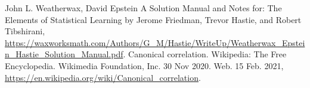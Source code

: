 \begin{thebibliography}{9}
John L. Weatherwax, David Epstein A Solution Manual and Notes for: The Elements of Statistical Learning by Jerome Friedman, Trevor Hastie, and Robert Tibshirani,
\url{https://waxworksmath.com/Authors/G\_M/Hastie/WriteUp/Weatherwax\_Epstein\_Hastie\_Solution\_Manual.pdf}.
Canonical correlation. Wikipedia: The Free Encyclopedia. Wikimedia Foundation, Inc. 30 Nov 2020. Web. 15 Feb. 2021, \url{https://en.wikipedia.org/wiki/Canonical\_correlation}.
\end{thebibliography}
